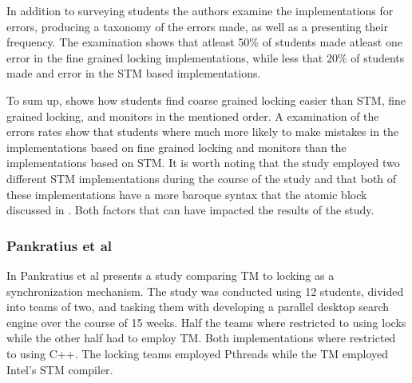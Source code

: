In addition to surveying students the authors examine the implementations for errors, producing a taxonomy of the errors made, as well as a presenting their frequency. The examination shows that atleast 50\% of students made atleast one error in the fine grained locking implementations, while less that 20\% of students made and error in the \ac{STM} based implementations. 

To sum up, \cite{rossbach2010transactional} shows how students find coarse grained locking easier than \ac{STM}, fine grained locking, and monitors in the mentioned order\cite[p. 54]{rossbach2010transactional}. A examination of the errors rates show that students where much more likely to make mistakes in the implementations based on fine grained locking and monitors than the implementations based on \ac{STM}\cite[p. 54]{rossbach2010transactional}. It is worth noting that the study employed two different \ac{STM} implementations during the course of the study and that both of these implementations have a more baroque syntax that the atomic block discussed in \cite[p. 49]{rossbach2010transactional}. Both factors that can have impacted the results of the study.

\subsubsection{Pankratius et al}
\label{sec:stm_ease_pankratius}
In \cite{pankratius2009does} Pankratius et al presents a study comparing \ac{TM} to locking as a synchronization mechanism. The study was conducted using 12 students, divided into teams of two, and tasking them with developing a parallel desktop search engine over the course of 15 weeks. Half the teams where restricted to using locks while the other half had to employ \ac{TM}. Both implementations where restricted to using C++. The locking teams employed Pthreads\cite[p. 2]{pankratius2009does} while the \ac{TM} employed Intel’s STM compiler\cite[p. 3]{pankratius2009does}.


